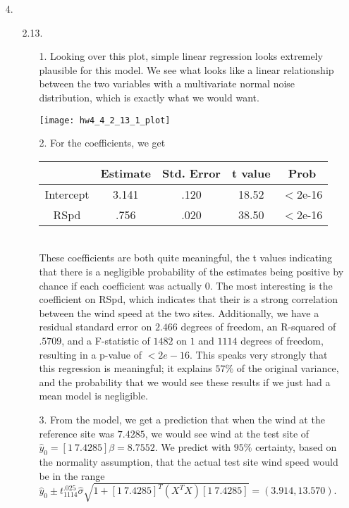 \documentclass[11pt]{article}
\theoremstyle{definition}
\begin{document}
\begin{itemize}
\begin{itemize}
                
            
                
        \end{itemize}
    \item[4.]
        \begin{itemize}
            \item[2.13.]
                \begin{itemize}
                    \item[1.]
                        Looking over this plot, simple linear regression looks extremely plausible for this model. We see what looks like a linear relationship between the two variables with a multivariate normal noise distribution, which is exactly what we would want.
                        \begin{center}
                            \texttt{[image: hw4\_4\_2\_13\_1\_plot]} 
                        \end{center}
                    \item[2.]
                        For the coefficients, we get \\
                        \begin{tabular}{c | c c c c}
                            & Estimate & Std. Error & t value & Prob \\
                            \hline
                            Intercept & 3.141 & .120 & 18.52 & $<$2e-16 \\
                            RSpd      & .756 & .020 & 38.50 & $<$2e-16
                        \end{tabular} \\
                        These coefficients are both quite meaningful, the t values indicating that there is a negligible probability of the estimates being positive by chance if each coefficient was actually 0. The most interesting is the coefficient on RSpd, which indicates that their is a strong correlation between the wind speed at the two sites. Additionally, we have a residual standard error on $2.466$ degrees of freedom, an R-squared of $.5709$, and a F-statistic of $1482$ on $1$ and $1114$ degrees of freedom, resulting in a p-value of $<2e-16$. This speaks very strongly that this regression is meaningful; it explains $57\%$ of the original variance, and the probability that we would see these results if we just had a mean model is negligible.
                    \item[3.]
                        From the model, we get a prediction that when the wind at the reference site was $7.4285$, we would see wind at the test site of $\hat y_0 = [1 \> 7.4285]\beta = 8.7552$. We predict with $95\%$ certainty, based on the normality assumption, that the actual test site wind speed would be in the range \(\hat y_0 \pm t_{1114}^{.025} \hat\sigma\sqrt{1 + [1\> 7.4285]^T(X^TX)[1\> 7.4285]} = (3.914,13.570) \).

\end{itemize}
\end{itemize}
\end{itemize}
\end{document}
